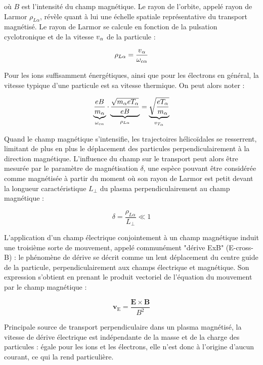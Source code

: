\begin{refsection}
où $B$ est l'intensité du champ magnétique. Le rayon de l'orbite, appelé rayon
de Larmor $\rho_{L\alpha}$, révèle quant à lui une échelle spatiale représentative du transport magnétisé.
Le rayon de Larmor se calcule en fonction de la pulsation cyclotronique et de la vitesse
$v{_{\alpha}}$ de la particule :

\begin{equation}
\rho_{L \alpha}
=\frac{v{_{\alpha}}}{\omega_{c{\alpha}}}
\end{equation}

Pour les ions suffisamment énergétiques, ainsi que pour les électrons en général,
la vitesse typique d'une particule est sa vitesse thermique. On peut alors noter
:

\begin{equation}
\underbrace{\frac{e B}{m_\alpha}}_{\omega_{c\alpha}}
\cdot\underbrace{\frac{\sqrt{m_\alpha eT_\alpha}}{eB}}_{\rho_{L\alpha}}
=\underbrace{\sqrt{\frac{eT_{\alpha}}{m_{\alpha}}}}_{v{_{T_{\alpha}}}}
\end{equation}

Quand le champ magnétique s'intensifie, les trajectoires
hélicoïdales se resserrent, limitant de plus en plus le déplacement des
particules perpendiculairement à la direction magnétique. L'influence du champ
sur le transport peut alors être mesurée par le paramètre de
magnétisation $\delta$, une espèce pouvant être considérée comme magnétisée à
partir du moment où son rayon de
Larmor est petit devant la longueur caractéristique $L_\perp$ du plasma
perpendiculairement au champ magnétique :

\begin{equation}
\delta=\frac{\rho_{L\alpha}}{L_\perp}\ll 1
\end{equation}

L'application d'un champ électrique conjointement à un champ magnétique
induit une troisième sorte de mouvement, appelé communément "dérive
ExB" (E-cross-B) : le phénomène de dérive se décrit comme un lent déplacement du
centre guide de la particule, perpendiculairement aux champs électrique et
magnétique. Son expression s'obtient en
prenant le produit vectoriel de l'équation du mouvement par le champ magnétique
:

\begin{equation}
\mathbf{v}_\text{E}=\frac{\mathbf{E}\times\mathbf{B}}{B^2}
\end{equation}

Principale source de transport perpendiculaire
dans un plasma magnétisé, la vitesse de dérive électrique est indépendante de
la masse et de la charge des particules : égale pour les ions et les électrons, elle n'est donc à
l'origine d'aucun courant, ce qui la rend particulière. 


\end{refsection}
